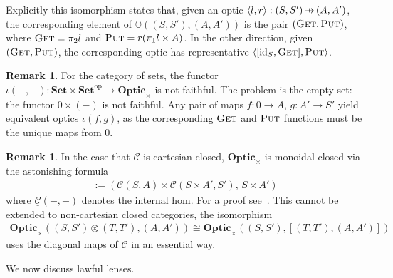 \documentclass[11pt,a4paper]{article}
\theoremstyle{plain}
\theoremstyle{definition}
\newtheorem{remark}[theorem]{Remark}
\newcommand{\C}{\mathscr{C}}
\newcommand{\homC}{\underline{\C}}
\newcommand{\Set}{\mathbf{Set}}
\newcommand{\Optic}{\mathbf{Optic}}
\newcommand{\id}{\mathrm{id}}
\newcommand{\op}{\mathrm{op}}
\newcommand{\fget}{\textsc{Get}}
\newcommand{\fput}{\textsc{Put}}
\newcommand{\hto}{\ensuremath{\,\mathaccent\shortmid\rightarrow\,}}
\begin{document}
Explicitly this isomorphism states that, given an optic $\langle l, r \rangle : (S, S') \hto (A, A')$, the corresponding element of $\mathbb{O}((S, S'), (A, A'))$ is the pair $(\fget, \fput)$, where $\fget = \pi_2 l$ and $\fput = r (\pi_1 l \times A)$. In the other direction, given $(\fget, \fput)$, the corresponding optic has representative $\langle [\id_S, \fget],  \fput \rangle$.

\begin{remark}\label{lens-iota-not-faithful}
  For the category of sets, the functor $\iota(-, -) : \Set \times \Set^\op \to \Optic_\times$ is not faithful. The problem is the empty set: the functor $0 \times (-)$ is not faithful. Any pair of maps $f : 0 \to A$, $g : A' \to S'$ yield equivalent optics $\iota(f, g)$, as the corresponding $\fget$ and $\fput$ functions must be the unique maps from $0$.
\end{remark}

\begin{remark}
  In the case that $\C$ is cartesian closed, $\Optic_\times$ is monoidal closed via the astonishing formula
  \begin{align*}
    [(S, S'), (A, A')] := (\homC(S, A) \times \homC(S \times A', S'), \, S \times A')
  \end{align*}
  where $\homC(-, -)$ denotes the internal hom. For a proof see~\cite[Section 1.2]{DialecticaCategories}. This cannot be extended to non-cartesian closed categories, the isomorphism
  \begin{align*}
    \Optic_\times((S, S') \otimes (T, T'), (A, A')) \cong \Optic_\times((S, S'),  [(T, T'), (A, A')])
  \end{align*}
  uses the diagonal maps of $\C$ in an essential way.
\end{remark}

We now discuss lawful lenses.
\end{document}
